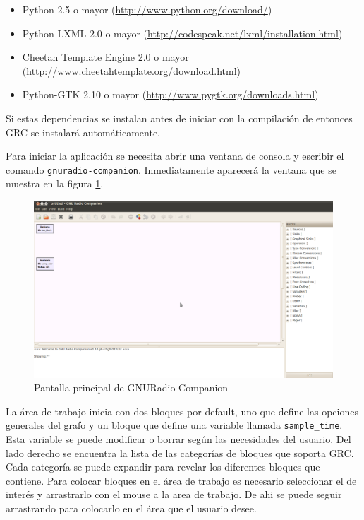 \begin{itemize}
  \item Python 2.5 o mayor (\url{http://www.python.org/download/})
  \item Python-LXML 2.0 o  mayor (\url{http://codespeak.net/lxml/installation.html})
  \item Cheetah Template Engine 2.0 o mayor (\url{http://www.cheetahtemplate.org/download.html})
  \item Python-GTK 2.10 o mayor (\url{http://www.pygtk.org/downloads.html})
\end{itemize}

Si estas dependencias se instalan antes de iniciar con la compilaci\'on de \gnuradio entonces GRC se
instalar\'a autom\'aticamente.

Para iniciar la aplicaci\'on se necesita abrir una ventana de consola y escribir el comando
\verb|gnuradio-companion|. Inmediatamente aparecer\'a la ventana que se muestra en la figura
\ref{fig:grc}.

\begin{figure}[tp]
  \centering
  \includegraphics[width=5.5in]{figs/grc1}
  \vspace{0.3in}
  \caption{Pantalla principal de GNURadio Companion}
  \label{fig:grc}
\end{figure}

La \'area de trabajo inicia con dos bloques por default, uno que define las opciones generales del
grafo y un bloque que define una variable llamada \verb|sample_time|. Esta variable se puede
modificar o borrar seg\'un las necesidades del usuario. Del lado derecho se encuentra la lista de las
categor\'ias de bloques que soporta GRC. Cada categor\'ia se puede expandir para revelar los
diferentes bloques que contiene. Para colocar bloques en el \'area de trabajo es necesario
seleccionar el de inter\'es y arrastrarlo con el mouse a la area de trabajo. De ahi se puede seguir
arrastrando para colocarlo en el \'area que el usuario desee. 

